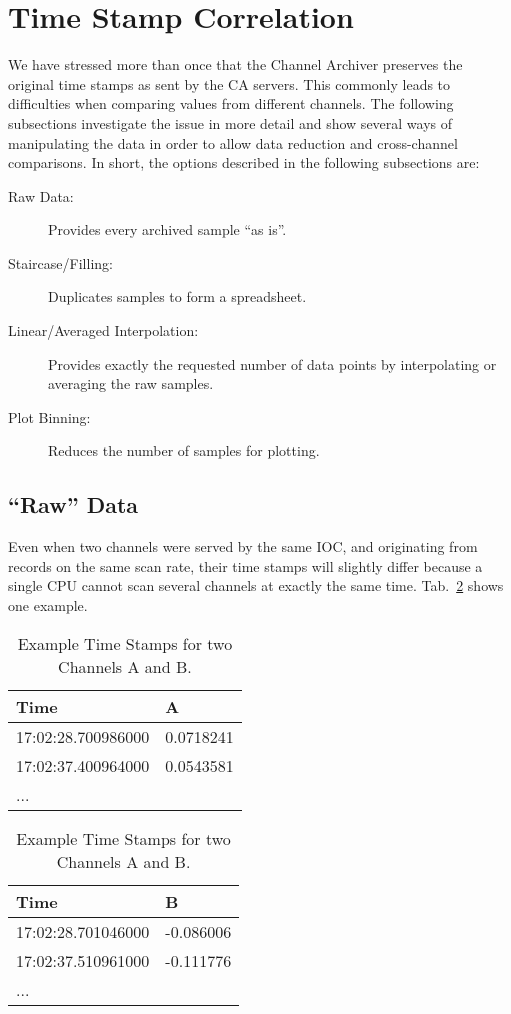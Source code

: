 \section{Time Stamp Correlation} \label{sec:timestampcorr}
We have stressed more than once that the Channel Archiver preserves
the original time stamps as sent by the CA servers.  This commonly
leads to difficulties when comparing values from different
channels. The following subsections investigate the issue in more
detail and show several ways of manipulating the data in order to
allow data reduction and cross-channel comparisons.
In short, the options described in the following subsections are:
\begin{description}
\item[\sffamily Raw Data:]
  Provides every archived sample ``as is''.
\item[\sffamily Staircase/Filling:]
  Duplicates samples to form a spreadsheet.
\item[\sffamily Linear/Averaged Interpolation:]
  Provides exactly the requested number of data points by
  interpolating or averaging the raw samples.
\item[\sffamily Plot Binning:]
  Reduces the number of samples for plotting.
\end{description}

\subsection{``Raw'' Data} \label{sec:rawdata}
Even when two channels were served by the same IOC, and originating from
records on the same scan rate, their time stamps will slightly differ
because a single CPU cannot scan several channels at exactly the same
time.  Tab.~\ref{tab:ABtimes} shows one example.

\begin{table}[htbp]
  \begin{center}
    \begin{minipage}[t]{0.49\textwidth}
      \sffamily
      \begin{tabular}[t]{l|l}
        Time               & A         \\
        \hline
        17:02:28.700986000 & 0.0718241 \\
        17:02:37.400964000 & 0.0543581 \\
        ...
      \end{tabular}
    \end{minipage}%
    \begin{minipage}[t]{0.49\textwidth}
      \sffamily
      \begin{tabular}[t]{l|l}
        Time               & B         \\
        \hline
        17:02:28.701046000 & -0.086006 \\
        17:02:37.510961000 & -0.111776 \\
        ...
      \end{tabular}
    \end{minipage}%
    \caption{Example Time Stamps for two Channels A and B.}
    \label{tab:ABtimes}
  \end{center}
\end{table}

